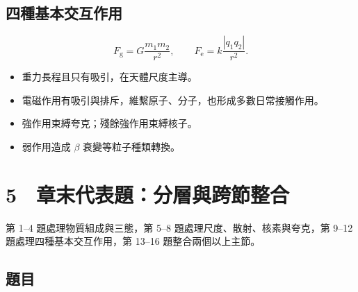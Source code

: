 \documentclass[11pt,a4paper]{article}
\providecommand{\tightlist}{%
  \setlength{\itemsep}{0pt}\setlength{\parskip}{0pt}}
\begin{document}
\subsection{四種基本交互作用}\label{ux56dbux7a2eux57faux672cux4ea4ux4e92ux4f5cux7528}

\[
F_{\mathrm g}=G\frac{m_1m_2}{r^2},
\qquad
F_{\mathrm e}=k\frac{|q_1q_2|}{r^2}.
\]

\begin{itemize}
\tightlist
\item
  重力長程且只有吸引，在天體尺度主導。
\item
  電磁作用有吸引與排斥，維繫原子、分子，也形成多數日常接觸作用。
\item
  強作用束縛夸克；殘餘強作用束縛核子。
\item
  弱作用造成 \(\beta\) 衰變等粒子種類轉換。
\end{itemize}

\section{5　章末代表題：分層與跨節整合}\label{ux7ae0ux672bux4ee3ux8868ux984cux5206ux5c64ux8207ux8de8ux7bc0ux6574ux5408}

第 1--4 題處理物質組成與三態，第 5--8 題處理尺度、散射、核素與夸克，第 9--12 題處理四種基本交互作用，第 13--16 題整合兩個以上主節。

\subsection{題目}\label{ux984cux76ee}
\end{document}
